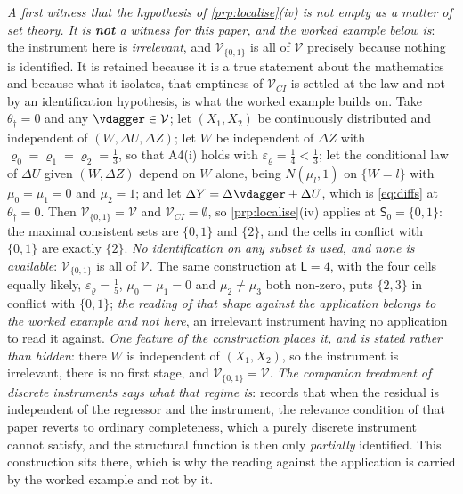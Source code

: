 \emph{A first witness that the hypothesis of \cref{prp:localise}\textup{(iv)} is not empty as a
matter of set theory. It is \textbf{not} a witness for this paper, and the worked example below is}: the
instrument here is \emph{irrelevant}, and $\mathcal V_{\{0,1\}}$ is all of $\mathcal V$ precisely because
nothing is identified. It is retained because it is a true statement about the mathematics and because
what it isolates, that emptiness of $\mathcal V_{CI}$ is settled at the law and not by an
identification hypothesis, is what the worked example builds on.
Take $\theta_\dagger=0$ and any $\vdagger\in\mathcal V$;
let $(X_1,X_2)$ be continuously distributed and independent of $(W,\Delta U,\Delta Z)$; let $W$ be
independent of $\Delta Z$ with $\varrho_0=\varrho_1=\varrho_2=\tfrac13$, so that A4(i) holds with
$\varepsilon_\varrho=\tfrac14<\tfrac13$; let the conditional law of $\Delta U$ given $(W,\Delta Z)$
depend on $W$ alone, being $N(\mu_l,1)$ on $\{W=l\}$ with $\mu_0=\mu_1=0$ and $\mu_2=1$; and let
$\Delta Y=\Delta\vdagger+\Delta U$, which is
\eqref{eq:diffs} at $\theta_\dagger=0$. Then $\mathcal V_{\{0,1\}}=\mathcal V$ and
$\mathcal V_{CI}=\emptyset$, so \cref{prp:localise}\textup{(iv)} applies at $\mathsf S_0=\{0,1\}$: the
maximal consistent sets are $\{0,1\}$ and $\{2\}$, and the cells in conflict with $\{0,1\}$ are exactly
$\{2\}$. \emph{No identification on any subset is used, and none is available}: $\mathcal V_{\{0,1\}}$
is all of $\mathcal V$. The same construction at $\mathsf L=4$, with the four cells equally likely,
$\varepsilon_\varrho=\tfrac15$, $\mu_0=\mu_1=0$ and $\mu_2\neq\mu_3$ both non-zero, puts $\{2,3\}$ in
conflict with $\{0,1\}$; \emph{the reading of that shape against the application belongs to the worked
example and not here}, an irrelevant instrument having no application to read it against.
\emph{One feature of the construction places it, and is stated rather than hidden}: there $W$ is
independent of $(X_1,X_2)$, so the instrument is irrelevant, there is no first stage, and
$\mathcal V_{\{0,1\}}=\mathcal V$. \emph{The companion treatment of discrete instruments says what that
regime is}: \citet[Remark~2]{centorrinofeveflorens2019} records that when the residual is independent of
the regressor and the instrument, the relevance condition of that paper reverts to ordinary
completeness, which a purely discrete instrument cannot satisfy, and the structural function is then
only \emph{partially} identified. This construction sits there, which is why the reading against the
application is carried by the worked example and not by it.

